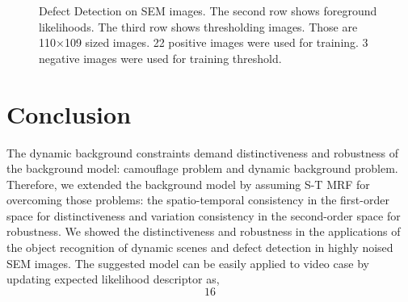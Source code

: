 \documentclass[conference]{IEEEtran}
\begin{document}
\begin{figure}[!t]
  \hfill
  \hfill
  \hfill
  \caption{Defect Detection on SEM images. The second row shows foreground likelihoods. The third row shows thresholding images. Those are 110×109 sized images. 22 positive images were used for training. 3 negative images were used for training threshold.}
\end{figure}



\section{Conclusion}

The dynamic background constraints demand distinctiveness and robustness of the background model: camouflage problem and dynamic background problem. Therefore, we extended the background model by assuming S-T MRF for overcoming those problems: the spatio-temporal consistency in the first-order space for distinctiveness and variation consistency in the second-order space for robustness. We showed the distinctiveness and robustness in the applications of the object recognition of dynamic scenes and defect detection in highly noised SEM images.
The suggested model can be easily applied to video case by updating expected likelihood descriptor   as,
\begin{equation}\label{eq:160}
  16
\end{equation}
\end{document}
